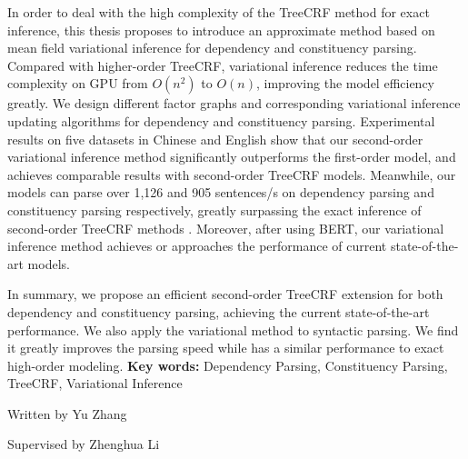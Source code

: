 \begin{eabstract}
\begin{enumerate}
          In order to deal with the high complexity of the TreeCRF method for exact inference, this thesis proposes to introduce an approximate method based on mean field variational inference for dependency and constituency parsing.
          Compared with higher-order TreeCRF, variational inference reduces the time complexity on GPU from $O(n^2)$ to $O(n)$, improving the model efficiency greatly.
          We design different factor graphs and corresponding variational inference updating algorithms for dependency and constituency parsing.
          Experimental results on five datasets in Chinese and English show that our second-order variational inference method significantly outperforms the first-order model, and achieves comparable results with second-order TreeCRF models.
          Meanwhile, our models can parse over 1,126 and 905 sentences/s on dependency parsing and constituency parsing respectively, greatly surpassing the exact inference of second-order TreeCRF methods .
          Moreover, after using BERT, our variational inference method achieves or approaches the performance of current state-of-the-art models.
  \end{enumerate}

  In summary, we propose an efficient second-order TreeCRF extension for both dependency and constituency parsing, achieving the current state-of-the-art performance.
  We also apply the variational method to syntactic parsing.
  We find it greatly improves the parsing speed while has a similar performance to exact high-order modeling.
  \vskip 21bp
    {\bf{} Key words: }
  Dependency Parsing,
  Constituency Parsing,
  TreeCRF,
  Variational Inference
\end{eabstract}

\begin{flushright}
  Written by Yu Zhang

  Supervised by Zhenghua Li
\end{flushright}
